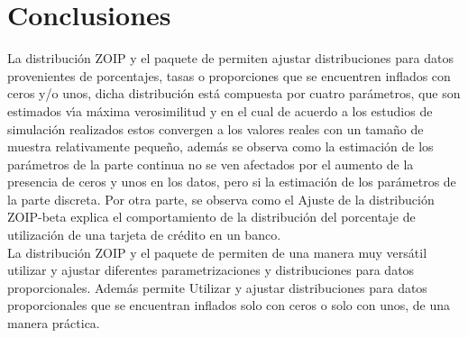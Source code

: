 \section{Conclusiones}

La distribuci\'{o}n ZOIP y el paquete  de  permiten ajustar distribuciones para datos provenientes de porcentajes, tasas o proporciones que se encuentren inflados con ceros y/o unos, dicha distribuci\'{o}n est\'{a} compuesta por cuatro par\'{a}metros, que son estimados v\'{\i}a m\'{a}xima verosimilitud y en el cual de acuerdo a los estudios de simulaci\'{o}n realizados estos convergen a los valores reales con un tama\~{n}o de muestra relativamente peque\~{n}o, adem\'{a}s se observa como la estimaci\'{o}n de los par\'{a}metros de la parte continua no se ven afectados por el aumento de la presencia de ceros y unos en los datos, pero si la estimaci\'{o}n de los par\'{a}metros de la parte discreta. Por otra parte, se observa como el Ajuste de la distribuci\'{o}n ZOIP-beta explica el comportamiento de la distribuci\'{o}n del porcentaje de utilizaci\'{o}n de una tarjeta de cr\'{e}dito en un banco.\\

La distribuci\'{o}n ZOIP y el paquete  de  permiten de una manera muy vers\'{a}til utilizar y ajustar diferentes parametrizaciones y distribuciones para datos proporcionales. Adem\'{a}s permite Utilizar y ajustar distribuciones para datos proporcionales que se encuentran inflados solo con ceros o solo con unos, de una manera pr\'{a}ctica.
